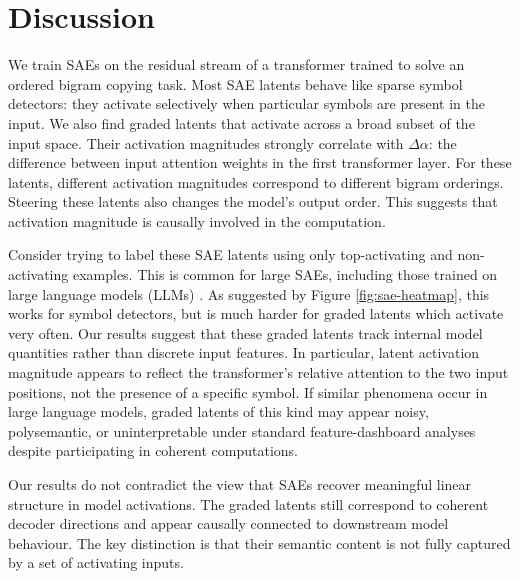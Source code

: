 \section{Discussion}\label{s:disc}


We train SAEs on the residual stream of a transformer trained to solve an ordered bigram copying task. Most SAE latents behave like sparse symbol detectors: they activate selectively when particular symbols are present in the input. We also find graded latents that activate across a broad subset of the input space. Their activation magnitudes strongly correlate with $\Delta \alpha$: the difference between input attention weights in the first transformer layer. For these latents, different activation magnitudes correspond to different bigram orderings.
Steering these latents also changes the model's output order. This suggests that activation magnitude is causally involved in the computation.

Consider trying to label these SAE latents using only top-activating and non-activating examples. This is common for large SAEs, including those trained on large language models (LLMs) \citep{paulo2025automatically,mcdougall2025gemmascope2}.
As suggested by Figure \ref{fig:sae-heatmap}, this works for symbol detectors, but is much harder for graded latents which activate very often.
Our results suggest that these graded latents track internal model quantities rather than discrete input features. In particular, latent activation magnitude appears to reflect the transformer's relative attention to the two input positions, not the presence of a specific symbol.
If similar phenomena occur in large language models, graded latents of this kind may appear noisy, polysemantic, or uninterpretable under standard feature-dashboard analyses despite participating in coherent computations.

Our results do not contradict the view that SAEs recover meaningful linear structure in model activations. The graded latents still correspond to coherent decoder directions and appear causally connected to downstream model behaviour. The key distinction is that their semantic content is not fully captured by a set of activating inputs.

